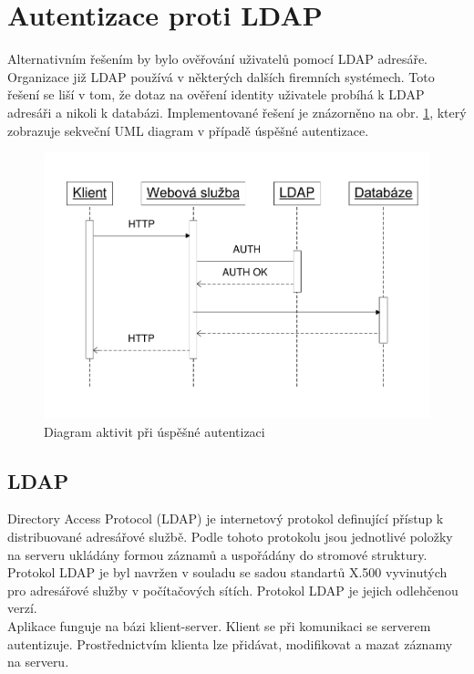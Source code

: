 \documentclass{diplomka}
\begin{document}
\section{Autentizace proti LDAP}
Alternativním řešením by bylo ověřování uživatelů pomocí LDAP adresáře. Organizace již LDAP používá v některých dalších firemních systémech. Toto řešení se liší v tom, že dotaz na ověření identity uživatele probíhá k LDAP adresáři a nikoli k databázi. Implementované řešení je znázorněno na obr. \ref{fig:authldap}, který zobrazuje sekveční UML diagram v případě úspěšné autentizace.
\begin{figure}[H]
  \centering
  \includegraphics[scale=0.8]{visio/auth_ldap.pdf}
\caption{Diagram aktivit při úspěšné autentizaci}
\label{fig:authldap}
\end{figure}
\vspace{-6mm}
\subsection{LDAP}
 Directory Access Protocol (LDAP) je internetový protokol definující přístup k distribuované adresářové službě. Podle tohoto protokolu jsou jednotlivé položky na serveru ukládány formou záznamů a uspořádány do stromové struktury. Protokol LDAP je byl navržen v souladu  se sadou standartů X.500 vyvinutých pro adresářové služby v počítačových sítích. Protokol LDAP je jejich odlehčenou verzí.\\ \indent
Aplikace funguje na bázi klient-server. Klient se při komunikaci se serverem autentizuje. Prostřednictvím klienta lze přidávat, modifikovat a mazat záznamy na serveru.
\end{document}
